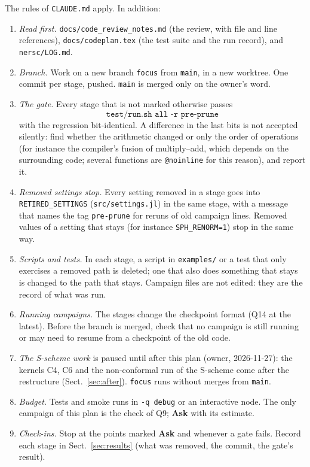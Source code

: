 \documentclass[11pt,aps,preprint,nofootinbib,superscriptaddress,tightenlines]{revtex4-2}
\def\st{\begin{equation}}
\def\stp{\end{equation}}
\def\Sect#1{Sect.~\ref{#1}}
\newcommand{\ask}{\textbf{Ask}}
\begin{document}
The rules of \nolinkurl{CLAUDE.md} apply.  In addition:
\begin{enumerate}
\item \emph{Read first.}  \nolinkurl{docs/code_review_notes.md} (the review, with file and line references), \nolinkurl{docs/codeplan.tex} (the
  test suite and the run record), and \nolinkurl{nersc/LOG.md}.
\item \emph{Branch.}  Work on a new branch \texttt{focus} from \texttt{main}, in a new worktree.  One commit per stage, pushed.  \texttt{main} is
  merged only on the owner's word.
\item \emph{The gate.}  Every stage that is not marked otherwise passes
  \st
  \texttt{test/run.sh all -r pre-prune}
  \stp
  with the regression bit-identical.  A difference in the last bits is not accepted silently: find whether the arithmetic changed or only the
  order of operations (for instance the compiler's fusion of multiply--add, which depends on the surrounding code; several functions are
  \texttt{@noinline} for this reason), and report it.
\item \emph{Removed settings stop.}  Every setting removed in a stage goes into \texttt{RETIRED\_SETTINGS} (\nolinkurl{src/settings.jl}) in the
  same stage, with a message that names the tag \texttt{pre-prune} for reruns of old campaign lines.  Removed values of a setting that stays (for
  instance \texttt{SPH\_RENORM=1}) stop in the same way.
\item \emph{Scripts and tests.}  In each stage, a script in \nolinkurl{examples/} or a test that only exercises a removed path is deleted; one that
  also does something that stays is changed to the path that stays.  Campaign files are not edited: they are the record of what was run.
\item \emph{Running campaigns.}  The stages change the checkpoint format (Q14 at the latest).  Before the branch is merged, check that no
  campaign is still running or may need to resume from a checkpoint of the old code.
\item \emph{The S-scheme work} is paused until after this plan (owner, 2026-11-27): the kernels C4, C6 and the non-conformal run of
  the S-scheme come after the restructure (\Sect{sec:after}).  \texttt{focus} runs without merges from \texttt{main}.
\item \emph{Budget.}  Tests and smoke runs in \texttt{-q debug} or an interactive node.  The only campaign of this plan is the check of Q9;
  \ask{} with its estimate.
\item \emph{Check-ins.}  Stop at the points marked \ask{} and whenever a gate fails.  Record each stage in \Sect{sec:results} (what was removed,
  the commit, the gate's result).
\end{enumerate}
\end{document}
